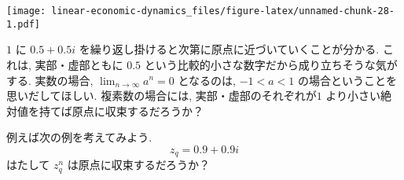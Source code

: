 \documentclass[a4paper]{scrbook}
\newenvironment{Shaded}{\begin{snugshade}}{\end{snugshade}}
\newcommand{\KeywordTok}[1]{\textcolor[rgb]{0.13,0.29,0.53}{\textbf{{#1}}}}
\newcommand{\DataTypeTok}[1]{\textcolor[rgb]{0.13,0.29,0.53}{{#1}}}
\newcommand{\DecValTok}[1]{\textcolor[rgb]{0.00,0.00,0.81}{{#1}}}
\newcommand{\FloatTok}[1]{\textcolor[rgb]{0.00,0.00,0.81}{{#1}}}
\newcommand{\StringTok}[1]{\textcolor[rgb]{0.31,0.60,0.02}{{#1}}}
\newcommand{\NormalTok}[1]{{#1}}
\theoremstyle{definition}
\begin{document}
\begin{Shaded}
\end{Shaded}

\texttt{[image: linear-economic-dynamics\_files/figure-latex/unnamed-chunk-28-1.pdf]}

\(1\) に \(0.5 + 0.5i\)
を繰り返し掛けると次第に原点に近づいていくことが分かる. これは,
実部・虚部ともに \(0.5\)
という比較的小さな数字だから成り立ちそうな気がする. 実数の場合,
\(\lim_{n\to \infty} a^n = 0\) となるのは, \(-1 < a < 1\)
の場合ということを思いだしてほしい. 複素数の場合には,
実部・虚部のそれぞれが\(1\)
より小さい絶対値を持てば原点に収束するだろうか？

例えば次の例を考えてみよう. \[
  z_q = 0.9 + 0.9i
\] はたして \(z_q^n\) は原点に収束するだろうか？
\end{document}
